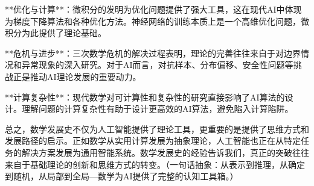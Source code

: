 **优化与计算**：微积分的发明为优化问题提供了强大工具，这在现代AI中体现为梯度下降算法和各种优化方法。神经网络的训练本质上是一个高维优化问题，微积分为此提供了理论基础。

**危机与进步**：三次数学危机的解决过程表明，理论的完善往往来自于对边界情况和异常现象的深入研究。对于AI而言，对抗样本、分布偏移、安全性问题等挑战正是推动AI理论发展的重要动力。

**计算复杂性**：现代数学对可计算性和复杂性的研究直接影响了AI算法的设计。理解问题的计算复杂性有助于设计更高效的AI算法，避免陷入计算陷阱。

总之，数学发展史不仅为人工智能提供了理论工具，更重要的是提供了思维方式和发展路径的启示。正如数学从实用计算发展为抽象理论，人工智能也正在从特定任务的解决方案发展为通用智能系统。数学发展史的经验告诉我们，真正的突破往往来自于基础理论的创新和思维方式的转变。{（一句话抽象：从表示到推理，从确定到随机，从局部到全局—数学为AI提供了完整的认知工具箱。）}